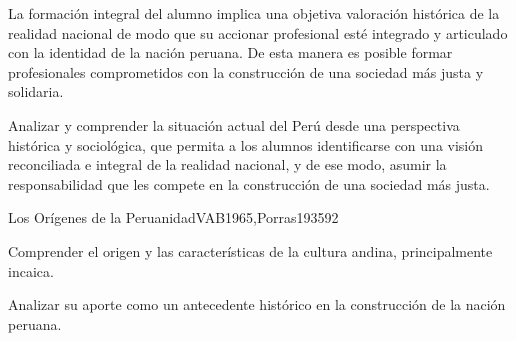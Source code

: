 \begin{syllabus}


\begin{justification}
La formación integral del alumno implica una objetiva valoración histórica de la 
realidad nacional de modo que su accionar profesional esté integrado y articulado 
con la identidad de la nación peruana. De esta manera es posible formar profesionales 
comprometidos con la construcción de una sociedad más justa y solidaria.
\end{justification}

\begin{goals}
\item Analizar y comprender la situación actual del Perú desde una perspectiva 
histórica y sociológica, que permita a los alumnos identificarse con una visión 
reconciliada e integral de la realidad nacional, y de ese modo, asumir la 
responsabilidad que les compete en la construcción de una sociedad más justa.
\end{goals}

\begin{outcomes}
\end{outcomes}

\begin{unit}{Los Orígenes de la Peruanidad}{VAB1965,Porras1935}{9}{2}
\begin{topics}
      \item 
\end{topics}
\begin{learningoutcomes}
      \item Comprender el origen y las características de la cultura andina, principalmente incaica.
      \item Analizar su aporte como un antecedente histórico en la construcción de la nación peruana.
\end{learningoutcomes}
\end{unit}


\end{syllabus}
